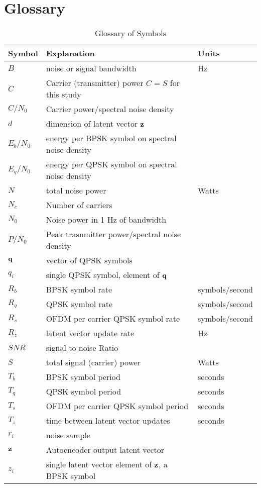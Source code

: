 \documentclass{article}
\begin{document}
\section{Glossary}

\begin{table} [H]
\centering
\begin{tabular}{l l l}
 \hline
 Symbol & Explanation & Units \\
 \hline
 $B$ & noise or signal bandwidth & Hz \\
 $C$ & Carrier (transmitter) power $C=S$ for this study \\
 $C/N_0$ & Carrier power/spectral noise density \\
 $d$ & dimension of latent vector $\bf{z}$ \\
 $E_b/N_0$ & energy per BPSK symbol on spectral noise density \\
 $E_q/N_0$ & energy per QPSK symbol on spectral noise density \\
 $N$ & total noise power & Watts \\
 $N_c$ & Number of carriers  \\
 $N_0$ & Noise power in 1 Hz of bandwidth  \\
 $P/N_0$ & Peak trasnmitter power/spectral noise density \\
 $\bf{q}$ & vector of QPSK symbols \\ 
 $q_i$ & single QPSK symbol, element of $\bf{q}$ \\ 
 $R_b$ & BPSK symbol rate & symbols/second \\
 $R_q$ & QPSK symbol rate & symbols/second \\
 $R_s$ & OFDM per carrier QPSK symbol rate & symbols/second \\
 $R_z$ & latent vector update rate & Hz \\
 $SNR$ & signal to noise Ratio \\
 $S$ & total signal (carrier) power & Watts \\
 $T_b$ & BPSK symbol period & seconds \\
 $T_q$ & QPSK symbol period & seconds \\
 $T_s$ & OFDM per carrier QPSK symbol period & seconds\\
 $T_z$ & time between latent vector updates & seconds\\
 $r_i$ & noise sample \\
 $\bf{z}$ & Autoencoder output latent vector \\ 
 $z_i$ & single latent vector element of $\bf{z}$, a BPSK symbol \\ 
 \hline
\end{tabular}
\caption{Glossary of Symbols}
\end{table}
\end{document}
